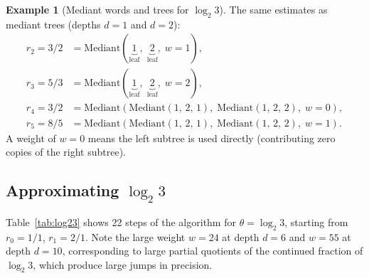 \documentclass[12pt]{article}
\theoremstyle{definition}
\newtheorem{example}[theorem]{Example}
\theoremstyle{remark}
\theoremstyle{plain}
\begin{document}
\begin{example}[Mediant words and trees for $\log_2 3$]
The same estimates as mediant trees (depths $d=1$ and $d=2$):
\begin{align*}
  r_{2} = 3/2 &= \mathrm{Mediant}(\underbrace{1}_{\text{leaf}},\;
                   \underbrace{2}_{\text{leaf}},\; w=1), \\
  r_{3} = 5/3 &= \mathrm{Mediant}(\underbrace{1}_{\text{leaf}},\;
                   \underbrace{2}_{\text{leaf}},\; w=2), \\
  r_{4} = 3/2 &= \mathrm{Mediant}(\mathrm{Mediant}(1,\, 2,\, 1),\;
                   \mathrm{Mediant}(1,\, 2,\, 2),\; w=0), \\
  r_{5} = 8/5 &= \mathrm{Mediant}(\mathrm{Mediant}(1,\, 2,\, 1),\;
                   \mathrm{Mediant}(1,\, 2,\, 2),\; w=1).
\end{align*}
A weight of $w=0$ means the left subtree is used directly (contributing zero copies
of the right subtree).
\end{example}

\subsection{Approximating \texorpdfstring{$\log_2 3$}{log\_2(3)}}

Table~\ref{tab:log23} shows 22 steps of the algorithm for $\theta = \log_2 3$,
starting from $r_0 = 1/1$, $r_1 = 2/1$.
Note the large weight $w = 24$ at depth $d=6$ and $w=55$ at depth $d=10$, corresponding
to large partial quotients of the continued fraction of $\log_2 3$, which produce
large jumps in precision.
\end{document}
